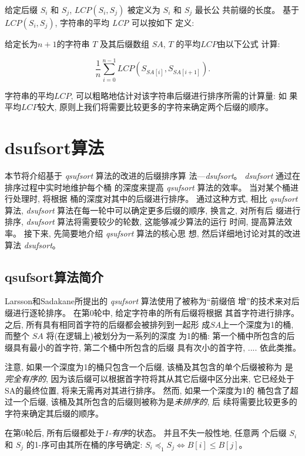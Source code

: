 给定后缀 $S_i$ 和 $S_j$, $LCP(S_i, S_j)$ 被定义为 $S_i$ 和 $S_j$ 最长公
共前缀的长度。 基于 $LCP(S_i, S_j)$, 字符串的平均 \emph{LCP} 可以按如下
定义:

给定长为$n+1$的字符串 $T$ 及其后缀数组 $SA$, $T$ 的平均$LCP$由以下公式
计算:

\begin{equation}
\frac{1}{n}\sum_{i=0}^{n-1}LCP(S_{SA[i]},S_{SA[i+1]}).
\end{equation}

字符串的平均$LCP$, 可以粗略地估计对该字符串后缀进行排序所需的计算量: 如
果平均$LCP$较大, 原则上我们将需要比较更多的字符来确定两个后缀的顺序。

\section{dsufsort算法}
\label{sec:3_Algorithm}

本节将介绍基于 \emph{qsufsort} 算法的改进的后缀排序算
法---\emph{dsufsort}。 \emph{dsufsort} 通过在排序过程中实时地维护每个桶
的深度来提高 \emph{qsufsort} 算法的效率。 当对某个桶进行处理时, 将根据
桶的深度对其中的后缀进行排序。 通过这种方式, 相比 \emph{qsufsort} 算法,
\emph{dsufsort} 算法在每一轮中可以确定更多后缀的顺序, 换言之, 对所有后
缀进行排序, \emph{dsufsort} 算法将需要较少的轮数, 这能够减少算法的运行
时间, 提高算法效率。 接下来, 先简要地介绍 \emph{qsufsort} 算法的核心思
想, 然后详细地讨论对其的改进算法 \emph{dsufsort}。

\subsection{qsufsort算法简介}
\label{sec:qsufsort}

Larsson和Sadakane所提出的 \emph{qsufsort} 算法使用了被称为“前缀倍
增”的技术来对后缀进行逐轮排序。 在第0轮中, 给定字符串的所有后缀将根据
其首字符进行排序。 之后, 所有具有相同首字符的后缀都会被排列到一起形
成$SA$上一个深度为1的桶, 而整个 $SA$ 将(在逻辑上)被划分为一系列的深度
为1的桶: 第一个桶中所包含的后缀具有最小的首字符, 第二个桶中所包含的后缀
具有次小的首字符, .... 依此类推。

注意, 如果一个深度为1的桶只包含一个后缀, 该桶及其包含的单个后缀被称为
是\emph{完全有序的}, 因为该后缀可以根据首字符将其从其它后缀中区分出来,
它已经处于SA的最终位置, 将来无需再对其进行排序。 然而, 如果一个深度为1的
桶包含了超过一个后缀, 该桶及其所包含的后缀则被称为是\emph{未排序的}, 后
续将需要比较更多的字符来确定其后缀的顺序。

在第0轮后, 所有后缀都处于\emph{1-有序}的状态。 并且不失一般性地, 任意两
个后缀 $S_i$ 和 $S_j$ 的1-序可由其所在桶的序号确定:
$S_i \preceq_1 S_j \iff B[i] \leq B[j]$。

